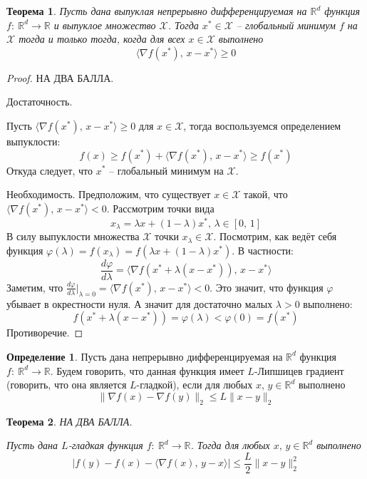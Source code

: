 \documentclass[a4paper,12pt]{article}
\renewcommand{\phi}{\ensuremath{\varphi}}
\renewcommand{\leq}{\ensuremath{\leqslant}}
\renewcommand{\geq}{\ensuremath{\geqslant}}
\theoremstyle{plain}
\newtheorem{theorem}{Теорема}[section]
\theoremstyle{definition}
\newtheorem{definition}{Определение}[section]
\theoremstyle{remark}
\begin{document}
\begin{theorem}
	Пусть дана выпуклая непрерывно дифференцируемая на $\mathbb{R}^d$ функция $f :\: \mathbb{R}^d  \to \mathbb{R}$ и выпуклое множество $\mathcal{X}$. Тогда $x^* \in \mathcal{X}$ -- глобальный минимум $f$ на $\mathcal{X}$ тогда и только тогда, когда для всех $x \in \mathcal{X}$ выполнено
	\[
		\langle\nabla f(x^*),\, x - x^*\rangle \geq 0
	\]
\end{theorem}

\begin{proof}
	НА ДВА БАЛЛА.

	Достаточность.

	Пусть $\langle \nabla f(x^*),\, x - x^*\rangle \geq 0$ для $x \in \mathcal{X}$, тогда воспользуемся определением выпуклости:
	\[
		f(x) \geq f(x^*) + \langle \nabla f(x^*),\, x- x^*\rangle \geq f(x^*)
	\]
	Откуда следует, что $x^*$ -- глобальный минимум на $\mathcal{X}$.

	Необходимость. Предположим, что существует $x \in \mathcal{X}$ такой, что $\langle \nabla f(x^*),\, x- x^*\rangle < 0$. Рассмотрим точки вида
	\[
		x_\lambda = \lambda x + (1 - \lambda)x^*,\, \lambda \in [0,\,1]
	\]
	В силу выпуклости множества $\mathcal{X}$ точки $x_\lambda \in \mathcal{X}$. Посмотрим, как ведёт себя функция $\phi(\lambda) = f(x_\lambda) = f(\lambda x + (1- \lambda)x^*)$. В частности:
	\[
		\frac{d\phi}{d\lambda} = \langle \nabla f(x^* + \lambda(x - x^*)),\, x - x^*\rangle
	\]
	Заметим, что $\frac{d\phi}{d\lambda}|_{\lambda = 0} = \langle\nabla f(x^*),\, x - x^*\rangle < 0$. Это значит, что функция $\phi$ убывает в окрестности нуля. А значит для достаточно малых $\lambda > 0$ выполнено:
	\[
		f(x^* + \lambda(x - x^*)) = \phi(\lambda) < \phi(0) = f(x^*)
	\]
	Противоречие.
\end{proof}

\begin{definition}
	Пусть дана непрерывно дифференцируемая на $\mathbb{R}^d$ функция $f :\: \mathbb{R}^d \to \mathbb{R}$. Будем говорить, что данная функция имеет $L$-Липшицев градиент (говорить, что она является $L$-гладкой), если для любых $x,\, y \in\mathbb{R}^d$ выполнено
	\[
		\|\nabla f(x) - \nabla f(y)\|_2 \leq L\|x - y\|_2
	\]
\end{definition}

\begin{theorem}
	НА ДВА БАЛЛА.

	Пусть дана $L$-гладкая функция $f :\: \mathbb{R}^d \to \mathbb{R}$. Тогда для любых $x,\, y \in \mathbb{R}^d$ выполнено
	\[
		\vert f(y) - f(x) - \langle\nabla f(x),\, y - x\rangle\vert \leq \frac{L}{2}\|x - y\|_2^2
	\]
\end{theorem}
\end{document}
